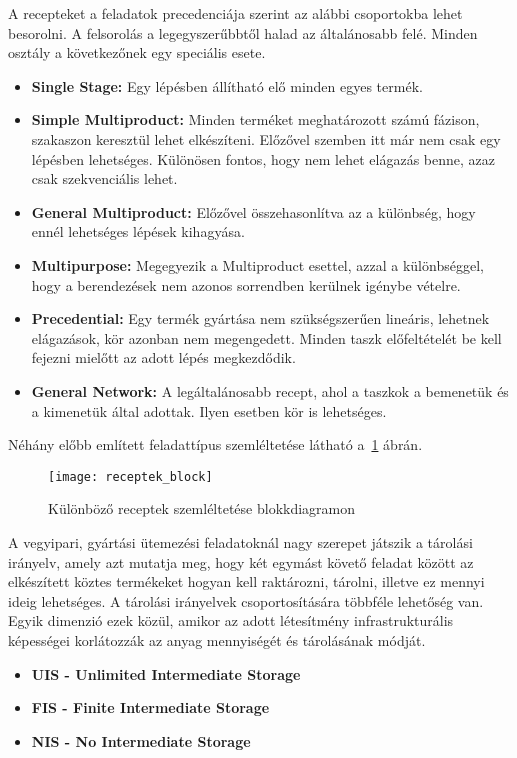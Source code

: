 A recepteket a feladatok precedenciája szerint az alábbi csoportokba lehet besorolni.
A felsorolás a legegyszerűbbtől halad az általánosabb felé.
Minden osztály a következőnek egy speciális esete.
\begin{itemize}
	\item \textbf{Single Stage:} Egy lépésben állítható elő minden egyes termék.
	\item \textbf{Simple Multiproduct:} Minden terméket meghatározott számú fázison, szakaszon keresztül lehet elkészíteni.
	Előzővel szemben itt már nem csak egy lépésben lehetséges.
	Különösen fontos, hogy nem lehet elágazás benne, azaz csak szekvenciális lehet.
	\item \textbf{General Multiproduct:} Előzővel összehasonlítva az a különbség, hogy ennél lehetséges lépések kihagyása.
	\item \textbf{Multipurpose:} Megegyezik a Multiproduct esettel, azzal a különbséggel, hogy a berendezések nem azonos sorrendben kerülnek igénybe vételre.
	\item \textbf{Precedential:} Egy termék gyártása nem szükségszerűen lineáris, lehetnek elágazások, kör azonban nem megengedett.
	Minden taszk előfeltételét be kell fejezni mielőtt az adott lépés megkezdődik. 
	\item \textbf{General Network:} A legáltalánosabb recept, ahol a taszkok a bemenetük és a kimenetük által adottak.
	Ilyen esetben kör is lehetséges.
\end{itemize}

Néhány előbb említett feladattípus szemléltetése látható a~\ref{receptek_block} ábrán.
\begin{figure}[H]	
\begin{center}
\texttt{[image: receptek\_block]}
\caption{Különböző receptek szemléltetése blokkdiagramon}
\label{receptek_block}
\end{center}
\end{figure}

\newpage
A vegyipari, gyártási ütemezési feladatoknál nagy szerepet játszik a tárolási irányelv, amely azt mutatja meg, hogy két egymást követő feladat között az elkészített köztes termékeket hogyan kell raktározni, tárolni, illetve ez mennyi ideig lehetséges.
A tárolási irányelvek csoportosítására többféle lehetőség van.
Egyik dimenzió ezek közül, amikor az adott létesítmény infrastrukturális képességei korlátozzák az anyag mennyiségét és tárolásának módját.
\begin{itemize}
	\item \textbf{UIS - Unlimited Intermediate Storage}
	\item \textbf{FIS - Finite Intermediate Storage}
	\item \textbf{NIS - No Intermediate Storage}
\end{itemize}

